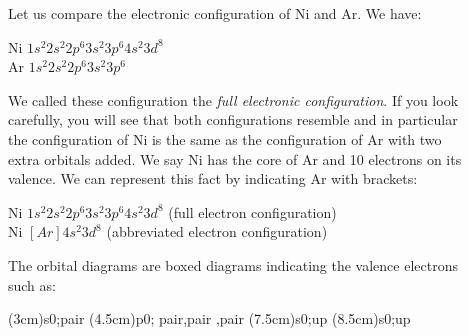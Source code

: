 \documentclass[main.tex]{subfiles}
\begin{document}
\begin{description}
\item[] 
Let us compare the electronic configuration of Ni and Ar. We have:
\begin{center}
Ni $1s^2 2s^2 2p^6 3s^2 3p^6 4s^2 3d^8$\\
Ar  $1s^2 2s^2 2p^6 3s^2 3p^6 $
 \end{center}
We called these configuration the \emph{full electronic configuration}. If you look carefully, you will see that both configurations resemble and in particular the configuration of Ni is the same as the configuration of Ar with two extra orbitals added. We say Ni has the core of Ar and 10 electrons on its valence. 
We can represent this fact by indicating Ar with brackets:
\begin{center}
Ni $1s^2 2s^2 2p^6 3s^2 3p^6 4s^2 3d^8$\hspace{1cm} \small (full electron configuration)\\
Ni $[Ar]4s^2 3d^8$\hspace{1cm} \small (abbreviated electron configuration)
 \end{center}
 The orbital diagrams are boxed diagrams indicating the valence electrons such as:
 \begin{center}\begin{MOdiagram}[style=round,AO-width=15pt, distance=1.5cm,lines={none},names-style={anchor=left, draw=blue}]
 \AO(3cm){s}{0;pair}
  \AO(4.5cm){p}{0; pair,pair  ,pair  }
   \AO(7.5cm){s}{0;up}
   \AO(8.5cm){s}{0;up}


\end{MOdiagram}
\end{center}
\end{description}
\end{document}
